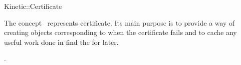 

\begin{ccRefConcept}{Kinetic::Certificate}


\ccDefinition
  
The concept \ccClassName\ represents certificate. Its main purpose is
to provide a way of creating  objects corresponding to when
the certificate fails and to cache any useful work done in find the
 for later.

\ccOperations





\ccSeeAlso

.

\end{ccRefConcept}


